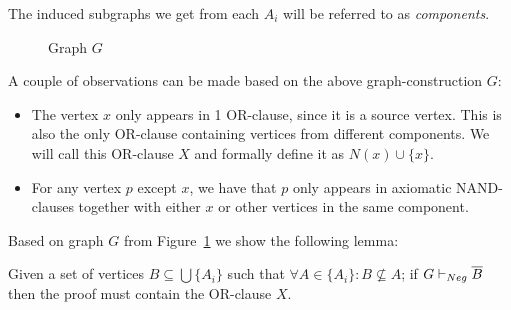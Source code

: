 The induced subgraphs we get from each $A_i$ will be referred to as \textit{components}.\par
\begin{figure}[!h]
  \centering
  \caption{Graph $G$}
  \label{fig:components_link}
\end{figure}
A couple of observations can be made based on the above graph-construction $G$:
\begin{itemize}
  \item The vertex $x$ only appears in 1 OR-clause, since it is a source vertex.
  This is also the only OR-clause containing vertices from different components.
  We will call this OR-clause $X$ and formally define it as $N(x) \cup \{ x\}$.
  \item For any vertex $p$ except $x$, we have that $p$ only appears in axiomatic NAND-clauses together with either $x$ or other vertices in the same component.
\end{itemize}
Based on graph $G$ from Figure~\ref{fig:components_link} we show the following lemma:
\begin{lemma}
  Given a set of vertices $B \subseteq \bigcup \{ A_i \}$ such that $\forall A \in \{A_i\}: B \not\subseteq A$;
  if $G \vdash_{Neg} \ol{B}$ then the proof must contain the OR-clause $X$.
  \label{thm:or_clause_lemma}
\end{lemma}
